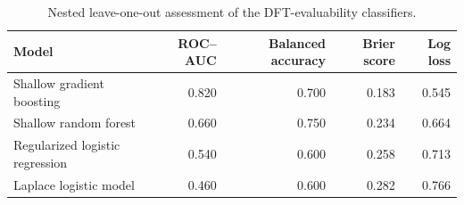 \begin{table}[!htbp]
\centering
\caption{Nested leave-one-out assessment of the DFT-evaluability classifiers.}
\label{tab:evaluator-validation}
\scriptsize
\begin{tabular}{lrrrr}
\toprule
Model & ROC--AUC & Balanced accuracy & Brier score & Log loss \\
\midrule
Shallow gradient boosting & 0.820 & 0.700 & 0.183 & 0.545 \\
Shallow random forest & 0.660 & 0.750 & 0.234 & 0.664 \\
Regularized logistic regression & 0.540 & 0.600 & 0.258 & 0.713 \\
Laplace logistic model & 0.460 & 0.600 & 0.282 & 0.766 \\
\bottomrule
\end{tabular}
\end{table}
